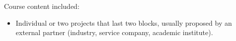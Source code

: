 Course content included:
\begin{itemize}
    \item Individual or two projects that last two blocks, usually proposed by an external partner (industry, service company, academic institute).
\end{itemize}